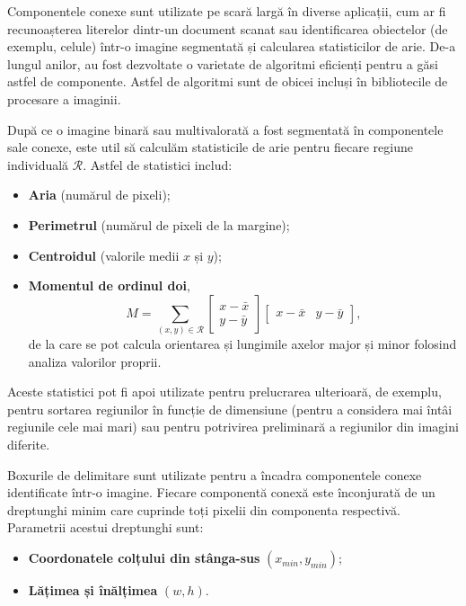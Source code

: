 Componentele conexe sunt utilizate pe scară largă în diverse aplicații, cum ar fi recunoașterea literelor dintr-un document scanat sau identificarea obiectelor (de exemplu, celule) într-o imagine segmentată și calcularea statisticilor de arie. De-a lungul anilor, au fost dezvoltate o varietate de algoritmi eficienți pentru a găsi astfel de componente. Astfel de algoritmi sunt de obicei incluși în bibliotecile de procesare a imaginii.

După ce o imagine binară sau multivalorată a fost segmentată în componentele sale conexe, este util să calculăm statisticile de arie pentru fiecare regiune individuală $\mathcal{R}$. Astfel de statistici includ:
\begin{itemize}
    \item \textbf{Aria} (numărul de pixeli);
    \item \textbf{Perimetrul} (numărul de pixeli de la margine);
    \item \textbf{Centroidul} (valorile medii $x$ și $y$);
    \item \textbf{Momentul de ordinul doi},
          \[
              M = \sum_{(x,y) \in \mathcal{R}} \begin{bmatrix}
                  x - \bar{x} \\
                  y - \bar{y}
              \end{bmatrix}
              \begin{bmatrix}
                  x - \bar{x} & y - \bar{y}
              \end{bmatrix},
          \]
          de la care se pot calcula orientarea și lungimile axelor major și minor folosind analiza valorilor proprii.
\end{itemize}

Aceste statistici pot fi apoi utilizate pentru prelucrarea ulterioară, de exemplu, pentru sortarea regiunilor în funcție de dimensiune (pentru a considera mai întâi regiunile cele mai mari) sau pentru potrivirea preliminară a regiunilor din imagini diferite.

Boxurile de delimitare sunt utilizate pentru a încadra componentele conexe identificate într-o imagine. Fiecare componentă conexă este înconjurată de un dreptunghi minim care cuprinde toți pixelii din componenta respectivă. Parametrii acestui dreptunghi sunt:
\begin{itemize}
    \item \textbf{Coordonatele colțului din stânga-sus} $(x_{min}, y_{min})$;
    \item \textbf{Lățimea și înălțimea} $(w, h)$.
\end{itemize}

